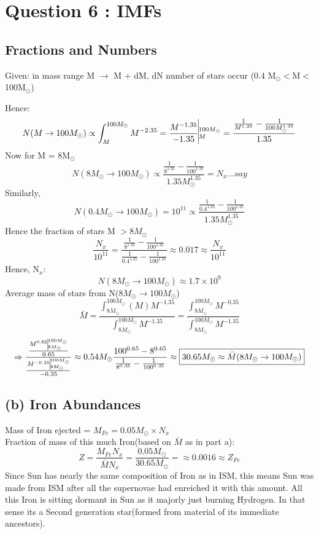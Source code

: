 \documentclass[11pt]{article}
\begin{document}
	
	
	
	\section{\color{teal} Question 6 : IMFs}
	
	\subsection{Fractions and Numbers}
	
	Given: in mass range M $\rightarrow$ M + dM, dN number of stars occur (0.4 M$_\odot<$M$<$100M$_\odot$)
	
	Hence:
	\[
		N(M\rightarrow 100M_\odot) \propto \int_M^{100M_\odot} M^{-2.35} = \frac{M^{-1.35}}{-1.35} \vline_M^{100M_\odot} = \frac{\frac{1}{M^{1.35}} - \frac{1}{100M_\odot^{1.35}}}{1.35}
	\]
	Now for M  = 8M$_\odot$
	\[
		N(8M_\odot \rightarrow 100M_\odot) \propto \frac{\frac{1}{8^{1.35}} - \frac{1}{100^{1.35}}}{1.35M_\odot^{1.35}} = N_x...{say}	
	\]
	Similarly,
	\[
		N(0.4 M_\odot \rightarrow 100 M_\odot) = 10^{11} \propto \frac{\frac{1}{0.4^{1.35}} - \frac{1}{100^{1.35}}}{1.35M_\odot^{1.35}} 
	\]
	Hence the fraction of stars M $> 8M_\odot$
	\[
		\frac{N_x}{10^{11}} = \frac{\frac{1}{8^{1.35}} - \frac{1}{100^{1.35}}}{\frac{1}{0.4^{1.35}} - \frac{1}{100^{1.35}}} \approx \boxed{0.017 \approx \frac{N_x}{10^{11}}}
	\]
	Hence, N$_x$:
	\[
		\boxed{N(8M_\odot \rightarrow 100M_\odot) \approx 1.7 \times 10^9} 
	\]
	Average mass of stars from N($8M_\odot \rightarrow 100 M_\odot$)
	\[
		\bar{M} = \frac{\int_{8M_\odot}^{100M_\odot}(M )M^{-1.35}}{\int_{8M_\odot}^{100M_\odot} M^{-1.35}} = \frac{\int_{8M_\odot}^{100M_\odot} M^{-0.35}}{\int_{8M_\odot}^{100M_\odot} M^{-1.35}}
	\]
	\[
		\Rightarrow \frac{\frac{M^{0.65} \vline_{8M_\odot}^{100M_\odot}}{0.65}}{\frac{M^{-0.35} \vline_{8M_\odot}^{100M_\odot}}{-0.35}} \approx 0.54 M_\odot \frac{100^{0.65}- 8^{0.65}}{\frac{1}{8^{0.35}}-\frac{1}{100^{0.35}}} \approx \boxed{30.65 M_\odot \approx \bar{M}(8M_\odot \rightarrow 100M_\odot)}
	\]
	
	\subsection{(b) Iron Abundances}
	
	Mass of Iron ejected = \( M_{Fe} = 0.05 M_\odot \times N_x \)\\
	Fraction of mass of this much Iron(based on $\bar{M}$ as in part a):
	\[
		Z = \frac{M_{Fe}N_x}{\bar{M}N_x}  = \frac{0.05 M_\odot}{30.65 M_\odot} =\approx \boxed{0.0016 \approx Z_{Fe}}
	\]
	Since Sun has nearly the same composition of Iron as in ISM, this means Sun was made from ISM after all the supernovae had enreiched it with this amount. All this Iron is sitting dormant in Sun as it majorly just burning Hydrogen. In that sense its a Second generation star(formed from material of its immediate ancestors).
	
	
	
\end{document}
